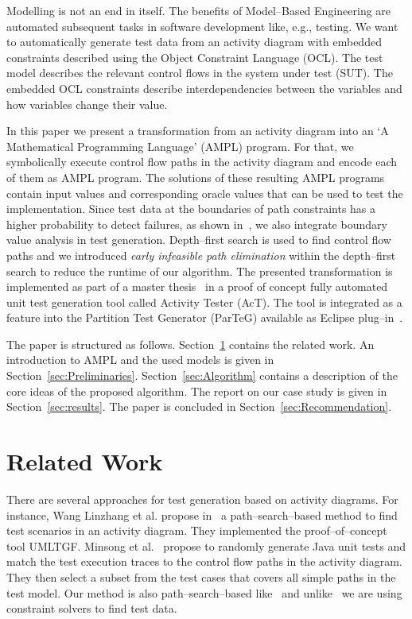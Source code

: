 \documentclass[runningheads,a4paper]{llncs}%
\begin{document}
Modelling is not an end in itself. The benefits of Model--Based Engineering are
automated subsequent tasks in software development like, e.g., testing. We want
to automatically generate test data from an activity diagram with embedded
constraints described using the Object Constraint Language (OCL). The test model
describes the relevant control flows in the system under test (SUT). The
embedded OCL constraints describe interdependencies between the variables and
how variables change their value.

In this paper we present a transformation from an activity diagram into an `A
Mathematical Programming Language' (AMPL) program. For that, we symbolically
execute control flow paths in the activity diagram and encode each of them as
AMPL program. The solutions of these resulting AMPL programs contain input
values and corresponding oracle values that can be used to test the
implementation. Since test data at the boundaries of path constraints has a
higher probability to detect failures, as shown
in~\cite{BoundaryValueTestingIsGood}, we also integrate boundary value analysis
in test generation. Depth--first search is used to find control flow paths and
we introduced \emph{early infeasible path elimination} within the depth--first
search to reduce the runtime of our algorithm. The presented transformation is
implemented as part of a master thesis~\cite{Kurth2014AutomatedGen} in a proof
of concept fully automated unit test generation tool called Activity Tester
(AcT). The tool is integrated as a feature into the Partition Test Generator
(ParTeG) available as Eclipse plug--in~\cite{PartegWebsite}.

The paper is structured as follows. Section~\ref{sec:LiteratureReview} contains
the related work. An introduction to AMPL and the used models is given in
Section~\ref{sec:Preliminaries}. Section~\ref{sec:Algorithm} contains a
description of the core ideas of the proposed algorithm. The report on our case
study is given in Section~\ref{sec:results}. The paper is concluded in
Section~\ref{sec:Recommendation}.%
%
\section{Related Work}%
\label{sec:LiteratureReview}%
There are several approaches for test generation based on activity diagrams. For
instance, Wang Linzhang et al. propose
in~\cite{Linzhang04GeneratingTestCasefromActivityGrayBoxMethod} a
path--search--based method to find test scenarios in an activity diagram. They
implemented the proof--of--concept tool UMLTGF. Minsong et
al.~\cite{mingsong2006automatic} propose to randomly generate Java unit tests
and match the test execution traces to the control flow paths in the activity
diagram. They then select a subset from the test cases that covers all simple
paths in the test model. Our method is also path--search--based
like~\cite{Linzhang04GeneratingTestCasefromActivityGrayBoxMethod} and
unlike~\cite{mingsong2006automatic} we are using constraint solvers to find test
data.
\end{document}
